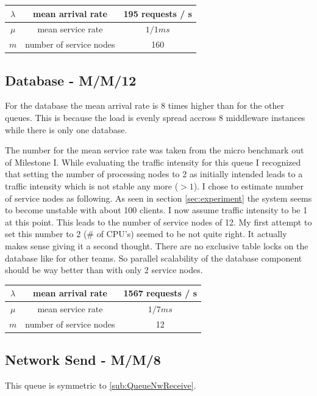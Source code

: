 \documentclass[a4paper]{article}
\begin{document}
\begin{tabular}{|c|c|c|}
\hline 
$\lambda$ & mean arrival rate & 195 requests / s \\ 
\hline 
$\mu$ & mean service rate & $1/1ms$ \\ 
\hline 
$m$ & number of service nodes & 160 \\ 
\hline 
\end{tabular} 


\subsection{Database - M/M/12}
\label{sub:QueueDatabase}

For the database the mean arrival rate is 8 times higher than for the other queues. This is because the load is evenly spread accross 8 middleware instances while there is only one database.

The number for the mean service rate was taken from the micro benchmark out of Milestone I. While evaluating the traffic intensity for this queue I recognized that setting the number of processing nodes to 2 as initially intended leads to a traffic intensity which is not stable any more ($>1$). I chose to estimate number of service nodes as following. As seen in section \ref{sec:experiment} the system seems to become unstable with about 100 clients. I now assume traffic intensity to be 1 at this point. This leads to the number of service nodes of 12. My first attempt to set this number to 2 (\# of CPU's) seemed to be not quite right. It actually makes sense giving it a second thought. There are no exclusive table locks on the database  like for other teams. So parallel scalability of the database component should be way better than with only 2 service nodes.\\

\begin{tabular}{|c|c|c|}
\hline 
$\lambda$ & mean arrival rate & 1567 requests / s \\ 
\hline 
$\mu$ & mean service rate & $1/7ms$ \\ 
\hline 
$m$ & number of service nodes & 12 \\ 
\hline 
\end{tabular} 


\subsection{Network Send - M/M/8}
This queue is symmetric to \ref{sub:QueueNwReceive}.
\end{document}
